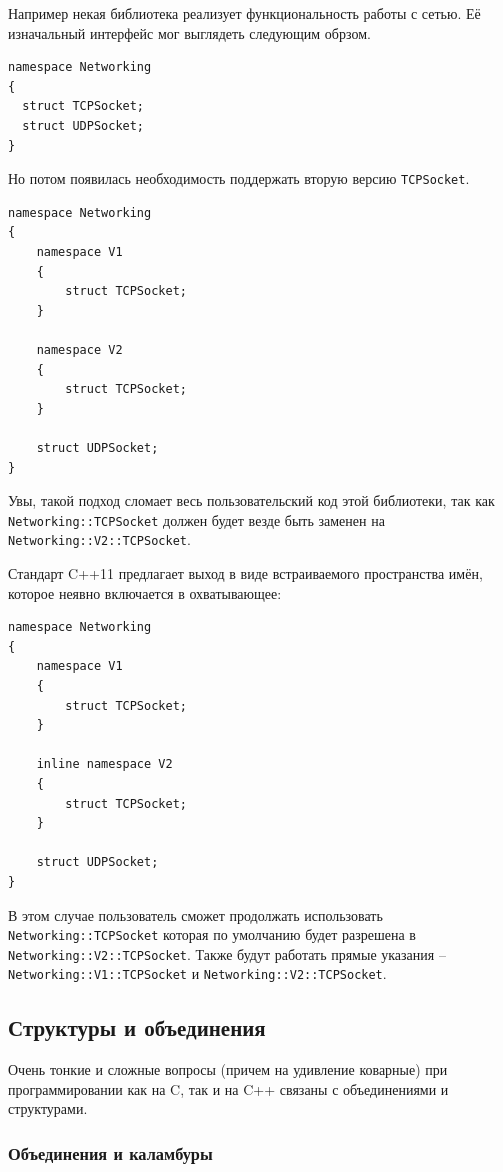 \documentclass[a4paper,12pt,oneside]{article}
\begin{document}
Например некая библиотека реализует функциональность работы с сетью. Её изначальный интерфейс мог выглядеть следующим обрзом.

\begin{lstlisting}
namespace Networking 
{
  struct TCPSocket;
  struct UDPSocket;
}
\end{lstlisting}

Но потом появилась необходимость поддержать вторую версию \lstinline!TCPSocket!.

\begin{lstlisting}
namespace Networking 
{
    namespace V1 
    {
        struct TCPSocket;
    }
     
    namespace V2 
    {
        struct TCPSocket;
    }
 
    struct UDPSocket;
}
\end{lstlisting}

Увы, такой подход сломает весь пользовательский код этой библиотеки, так как \lstinline!Networking::TCPSocket! должен будет везде быть заменен на \lstinline!Networking::V2::TCPSocket!.

Стандарт C++11 предлагает выход в виде встраиваемого пространства имён, которое неявно включается в охватывающее:

\begin{lstlisting}
namespace Networking 
{
    namespace V1 
    {
        struct TCPSocket;
    }
     
    inline namespace V2 
    {
        struct TCPSocket;
    }
 
    struct UDPSocket;
}
\end{lstlisting}

В этом случае пользователь сможет продолжать использовать \lstinline!Networking::TCPSocket! которая по умолчанию будет разрешена в \lstinline!Networking::V2::TCPSocket!. Также будут работать прямые указания -- \lstinline!Networking::V1::TCPSocket! и \lstinline!Networking::V2::TCPSocket!.

\subsection{Структуры и объединения}

Очень тонкие и сложные вопросы (причем на удивление коварные) при программировании как на C, так и на C++ связаны с объединениями и структурами.

\subsubsection{Объединения и каламбуры}
\end{document}
